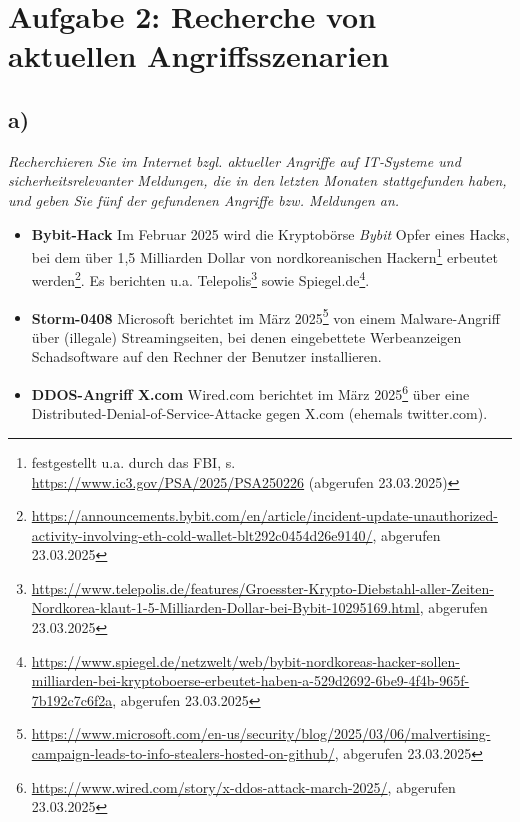 \chapter{Aufgabe 2: Recherche von aktuellen Angriffsszenarien}

\section{a)}

\textit{Recherchieren Sie im Internet bzgl. aktueller Angriffe auf IT‐Systeme und sicherheitsrelevanter Meldungen, die in den letzten Monaten stattgefunden haben, und geben Sie fünf der gefundenen Angriffe bzw. Meldungen an.}

\vspace{5mm}

\begin{itemize}
    \itemsep0.5em
    \item \textbf{Bybit-Hack} Im Februar 2025 wird die Kryptobörse \textit{Bybit} Opfer eines Hacks, bei dem über 1{,}5 Milliarden Dollar von nordkoreanischen Hackern\footnote{
        festgestellt u.a. durch das FBI, s. \url{https://www.ic3.gov/PSA/2025/PSA250226} (abgerufen 23.03.2025)
    } erbeutet werden\footnote{
        \url{https://announcements.bybit.com/en/article/incident-update-unauthorized-activity-involving-eth-cold-wallet-blt292c0454d26e9140/}, abgerufen 23.03.2025
    }. Es berichten u.a. Telepolis\footnote{
        \url{https://www.telepolis.de/features/Groesster-Krypto-Diebstahl-aller-Zeiten-Nordkorea-klaut-1-5-Milliarden-Dollar-bei-Bybit-10295169.html}, abgerufen 23.03.2025
    } sowie Spiegel.de\footnote{
        \url{https://www.spiegel.de/netzwelt/web/bybit-nordkoreas-hacker-sollen-milliarden-bei-kryptoboerse-erbeutet-haben-a-529d2692-6be9-4f4b-965f-7b192c7c6f2a}, abgerufen 23.03.2025
    }.
    \item \textbf{Storm-0408} Microsoft berichtet im März 2025\footnote{
        \url{https://www.microsoft.com/en-us/security/blog/2025/03/06/malvertising-campaign-leads-to-info-stealers-hosted-on-github/}, abgerufen 23.03.2025
    } von einem Malware-Angriff über (illegale) Streamingseiten, bei denen eingebettete Werbeanzeigen Schadsoftware auf den Rechner der Benutzer installieren.
    \item \textbf{DDOS-Angriff X.com} Wired.com berichtet im März 2025\footnote{
        \url{https://www.wired.com/story/x-ddos-attack-march-2025/}, abgerufen 23.03.2025
    } über eine Distributed-Denial-of-Service-Attacke gegen X.com (ehemals twitter.com).


\end{itemize}
